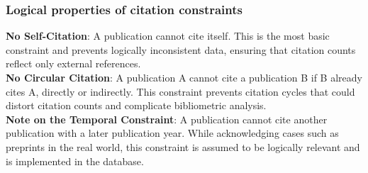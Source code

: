 \documentclass[a4paper,12pt]{article}
\begin{document}
\subsubsection*{Logical properties of citation constraints}
\textbf{No Self-Citation}: A publication cannot cite itself. This is the most basic constraint and prevents logically inconsistent data, ensuring that citation counts reflect only external references.\\
\textbf{No Circular Citation}: A publication A cannot cite a publication B if B already cites A, directly or indirectly. This constraint prevents citation cycles that could distort citation counts and complicate bibliometric analysis.\\
\textbf{Note on the Temporal Constraint}: A publication cannot cite another publication with a later publication year. While acknowledging cases such as preprints in the real world, this constraint is assumed to be logically relevant and is implemented in the database.\\
\end{document}
